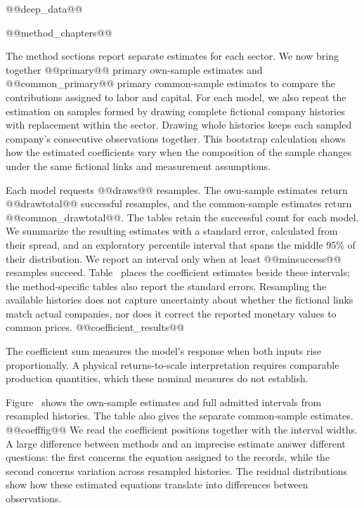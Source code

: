 @@deep_data@@

@@method_chapters@@

The method sections report separate estimates for each sector. We now bring together @@primary@@ primary own-sample estimates and @@common_primary@@ primary common-sample estimates to compare the contributions assigned to labor and capital. For each model, we also repeat the estimation on samples formed by drawing complete fictional company histories with replacement within the sector. Drawing whole histories keeps each sampled company's consecutive observations together. This bootstrap calculation shows how the estimated coefficients vary when the composition of the sample changes under the same fictional links and measurement assumptions.

Each model requests @@draws@@ resamples. The own-sample estimates return @@drawtotal@@ successful resamples, and the common-sample estimates return @@common_drawtotal@@. The tables retain the successful count for each model. We summarize the resulting estimates with a standard error, calculated from their spread, and an exploratory percentile interval that spans the middle 95\% of their distribution. We report an interval only when at least @@minsuccess@@ resamples succeed. Table~ places the coefficient estimates beside these intervals; the method-specific tables also report the standard errors. Resampling the available histories does not capture uncertainty about whether the fictional links match actual companies, nor does it correct the reported monetary values to common prices.
@@coefficient_results@@

The coefficient sum measures the model's response when both inputs rise proportionally. A physical returns-to-scale interpretation requires comparable production quantities, which these nominal measures do not establish.

Figure~ shows the own-sample estimates and full admitted intervals from resampled histories. The table also gives the separate common-sample estimates.
@@coefffig@@
We read the coefficient positions together with the interval widths. A large difference between methods and an imprecise estimate answer different questions: the first concerns the equation assigned to the records, while the second concerns variation across resampled histories. The residual distributions show how these estimated equations translate into differences between observations.

